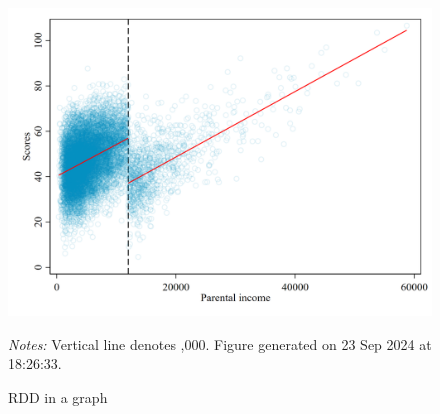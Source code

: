 \begin{figure}[!h]
\centering
\caption{RDD in a graph}
\label{fig:figure_1}
\includegraphics[width=.5\textwidth]{./figure_1}
\par \begin{minipage}[h]{\textwidth}{\scriptsize\textit{Notes:} Vertical line denotes ,000. Figure generated on 23 Sep 2024 at 18:26:33.}\end{minipage}
\end{figure}
